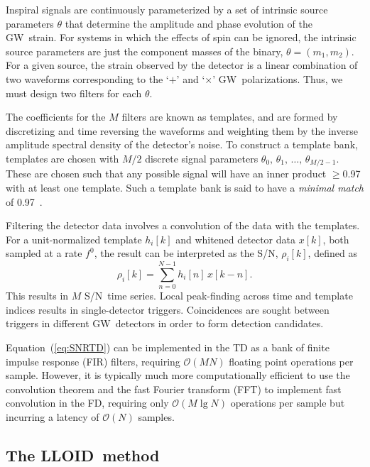 \documentclass[preprint2]{aastex}
\newcommand{\GW}{GW}%
\newcommand{\SNR}{S/N}%
\newcommand{\tmpsamps}{\ensuremath{N}}
\newcommand{\numtmps}{\ensuremath{M}}
\newcommand{\fir}{FIR}%
\newcommand{\fft}{FFT}%
\newcommand{\lloid}{LLOID}%
\begin{document}
Inspiral signals are continuously parameterized by a set of intrinsic source
parameters $\theta$ that determine the amplitude and phase evolution of the
\GW\ strain. For systems in which the effects of spin can be ignored, the intrinsic
source parameters are just the component masses of the binary,
 $\theta = (m_1, m_2)$. For a given source, the strain observed by the
 detector is a linear combination of two waveforms corresponding to the
`$+$' and `$\times$' \GW\ polarizations.  Thus, we must design two filters
for each $\theta$.

The coefficients for the $\numtmps$ filters are known as templates, 
and are formed by discretizing and time reversing the
waveforms and weighting them by the inverse amplitude spectral density of the
detector's noise.
To construct a template bank, templates are chosen with
$\numtmps/2$ discrete signal parameters $\theta_0,\, \theta_1,\, \dots,\,
\theta_{\numtmps/2-1}$. These are chosen such that any possible signal
will have an inner product $\geqslant$0.97 with at least one template.
Such a template bank is said to have a {\em minimal match} of 0.97~\citep{Owen:1998dk}.

Filtering the detector data involves a convolution of the data with the
templates.  For a unit-normalized template $h_i[k]$ and whitened detector data
$x[k]$, both sampled at a rate $f^0$, the result can be interpreted as the
\SNR, $\rho_i[k]$, defined as
%
%
\begin{equation}
	\label{eq:SNRTD}
	\rho_i [k] = \sum_{n=0}^{N-1} h_{i}[n] \, x [k-n].
\end{equation}
This results in $\numtmps$ \SNR\ time series. Local peak-finding across time and
template indices results in single-detector triggers.  Coincidences are sought
between triggers in different \GW\ detectors in order to form detection candidates.

Equation~(\ref{eq:SNRTD}) can be implemented in the TD as a bank of
finite impulse response (\fir) filters, requiring $\mathcal O(\numtmps
\tmpsamps)$ floating point operations per sample.  However, it is typically
much more computationally efficient to use the convolution theorem and the
fast Fourier transform (\fft) to implement fast convolution in the FD, requiring only
$\mathcal O(\numtmps \lg \tmpsamps)$ operations per sample but incurring
a latency of $\mathcal O(\tmpsamps)$ samples.


\subsection{The \lloid\ method}
\end{document}
